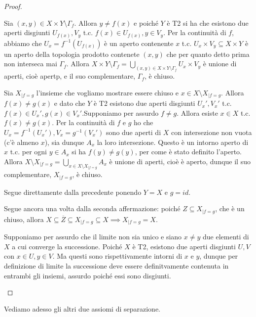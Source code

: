 \begin{proof}
  \begin{nlist}
    \item Sia $(x, y) \in X \times Y \setminus \Gamma_f$. Allora $y \not=f(x)$ e poiché $Y$ è T2 si ha che esistono due aperti disgiunti $U_{f(x)}, V_y$ t.c. $f(x) \in U_{f(x)}, y \in V_y$. Per la continuità di $f$, abbiamo che $U_x=f^{-1}(U_{f(x)})$ è un aperto contenente $x$ t.c. $U_x \times V_y \subseteq X \times Y$ è un aperto della topologia prodotto contenete $(x, y)$ che per quanto detto prima non interseca mai $\Gamma_f$. Allora
    $\displaystyle X \times Y \setminus \Gamma_f=\bigcup_{(x, y) \in X \times Y \setminus \Gamma_f} U_x \times V_y$ è unione di aperti, cioè apertp, e il suo complementare, $\Gamma_f$, è chiuso.
    \item Sia $X_{|f=g}$ l'insieme che vogliamo mostrare essere chiuso e $x \in X \setminus X_{|f=g}$. Allora $f(x) \not= g(x)$ e dato che $Y$ è T2 esistono due aperti disgiunti $U_x', V_x'$ t.c. $f(x) \in U_x', g(x) \in V_x'$.Supponiamo per assurdo $f \not=g$. Allora esiste $x \in X$ t.c. $f(x) \not= g(x)$.
    Per la continuità di $f$ e $g$ ho che $U_x=f^{-1}(U_x'), V_x=g^{-1}(V_x')$ sono due aperti di $X$ con intersezione non vuota (c'è almeno $x$), sia dunque $A_x$ la loro intersezione. Questo è un intorno aperto di $x$ t.c. per ogni $y \in A_x$ si ha $f(y) \not=g(y)$, per come è stato definito l'aperto. Allora $\displaystyle X \setminus X_{|f=g} = \bigcup_{x \in X \setminus X_{|f=g}} A_x$ è unione di aperti, cioè è aperto, dunque il suo complementare, $X_{|f=g}$, è chiuso.
    \item Segue direttamente dalla precedente ponendo $Y=X$ e $g=id$.
    \item Segue ancora una volta dalla seconda affermazione: poiché $Z \subseteq X_{|f=g}$, che è un chiuso, allora $X \subseteq \overline{Z} \subseteq X_{|f=g} \subseteq X \implies X_{|f=g} =X$.
    \item Supponiamo per assurdo che il limite non sia unico e siano $x \not= y$ due elementi di $X$ a cui converge la successione. Poiché $X$ è T2, esistono due aperti disgiunti $U, V$ con $x \in U, y \in V$. Ma questi sono rispettivamente intorni di $x$ e $y$, dunque per definizione di limite la successione deve essere definitvamente contenuta in entrambi gli insiemi, assurdo poiché essi sono disgiunti.
  \end{nlist}
\end{proof}

Vediamo adesso gli altri due assiomi di separazione.

